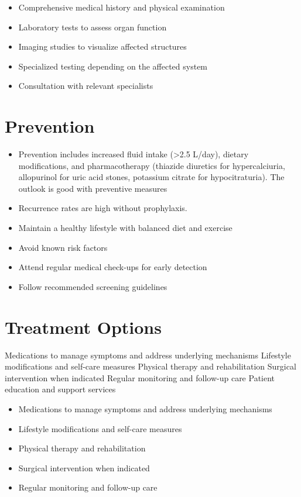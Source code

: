 \begin{itemize}[noitemsep]
  \item Comprehensive medical history and physical examination
  \item Laboratory tests to assess organ function
  \item Imaging studies to visualize affected structures
  \item Specialized testing depending on the affected system
  \item Consultation with relevant specialists
\end{itemize}
\section{Prevention}
\begin{itemize}[noitemsep]
  \item Prevention includes increased fluid intake (>2.5 L/day), dietary modifications, and pharmacotherapy (thiazide diuretics for hypercalciuria, allopurinol for uric acid stones, potassium citrate for hypocitraturia). The outlook is good with preventive measures
  \item Recurrence rates are high without prophylaxis.
  \item Maintain a healthy lifestyle with balanced diet and exercise
  \item Avoid known risk factors
  \item Attend regular medical check-ups for early detection
  \item Follow recommended screening guidelines
\end{itemize}
\section{Treatment Options}
Medications to manage symptoms and address underlying mechanisms Lifestyle modifications and self-care measures Physical therapy and rehabilitation Surgical intervention when indicated Regular monitoring and follow-up care Patient education and support services

\begin{itemize}[noitemsep]
  \item Medications to manage symptoms and address underlying mechanisms
  \item Lifestyle modifications and self-care measures
  \item Physical therapy and rehabilitation
  \item Surgical intervention when indicated
  \item Regular monitoring and follow-up care
\end{itemize}
